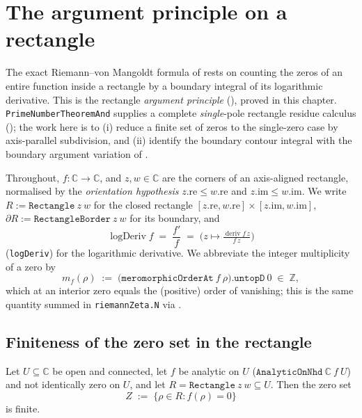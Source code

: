 
\chapter{The argument principle on a rectangle}
\label{cha:argument_principle}

The exact Riemann--von Mangoldt formula of  rests on counting
the zeros of an entire function inside a rectangle by a boundary integral of its
logarithmic derivative. This is the rectangle \emph{argument principle}
(), proved in this chapter.
\texttt{PrimeNumberTheoremAnd} supplies a complete \emph{single}-pole rectangle
residue calculus (); the work here is to (i) reduce a
finite set of zeros to the single-zero case by axis-parallel subdivision, and
(ii) identify the boundary contour integral with the boundary argument variation
of .

Throughout, $f:\mathbb C\to\mathbb C$, and $z,w\in\mathbb C$ are the corners of an
axis-aligned rectangle, normalised by the \emph{orientation hypothesis}
$z.\mathrm{re}\le w.\mathrm{re}$ and $z.\mathrm{im}\le w.\mathrm{im}$. We write
$R:=\texttt{Rectangle}\ z\ w$ for the closed rectangle
$[z.\mathrm{re},w.\mathrm{re}]\times[z.\mathrm{im},w.\mathrm{im}]$,
$\partial R:=\texttt{RectangleBorder}\ z\ w$ for its boundary, and
\[
  \operatorname{logDeriv} f \;=\; \frac{f'}{f}
  \;=\; \bigl(z\mapsto \tfrac{\operatorname{deriv} f\,z}{f\,z}\bigr)
\]
(\texttt{logDeriv}) for the logarithmic derivative. We abbreviate the integer
multiplicity of a zero by
\[
  m_f(\rho) \;:=\; \bigl(\texttt{meromorphicOrderAt}\ f\ \rho\bigr).\texttt{untopD}\ 0
  \;\in\;\mathbb Z ,
\]
which at an interior zero equals the (positive) order of vanishing; this is the
same quantity summed in \texttt{riemannZeta.N} via .

\section{Finiteness of the zero set in the rectangle}
\label{sec:ap_finite}

\begin{lemma}
\label{lem:ap_finite_zeros}
\leanok
Let $U\subseteq\mathbb C$ be open and connected, let $f$ be analytic on $U$
($\texttt{AnalyticOnNhd}\ \mathbb C\ f\ U$) and not identically zero on $U$, and let
$R=\texttt{Rectangle}\ z\ w\subseteq U$. Then the zero set
\[
  Z \;:=\; \{\rho\in R : f(\rho)=0\}
\]
is finite.
\end{lemma}

